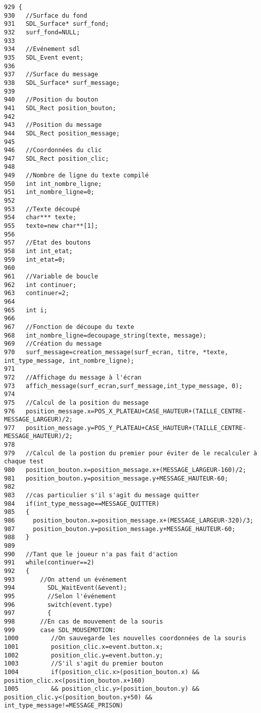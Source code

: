 \begin{Code}\begin{verbatim}929 {
930   //Surface du fond
931   SDL_Surface* surf_fond;
932   surf_fond=NULL;
933 
934   //Evénement sdl
935   SDL_Event event;
936   
937   //Surface du message
938   SDL_Surface* surf_message;
939   
940   //Position du bouton
941   SDL_Rect position_bouton;
942   
943   //Position du message
944   SDL_Rect position_message;
945   
946   //Coordonnées du clic
947   SDL_Rect position_clic;
948   
949   //Nombre de ligne du texte compilé
950   int int_nombre_ligne;
951   int_nombre_ligne=0;
952   
953   //Texte découpé
954   char*** texte;
955   texte=new char**[1];
956   
957   //Etat des boutons
958   int int_etat;
959   int_etat=0;
960   
961   //Variable de boucle
962   int continuer;
963   continuer=2;
964   
965   int i;
966   
967   //Fonction de découpe du texte 
968   int_nombre_ligne=decoupage_string(texte, message);
969   //Création du message
970   surf_message=creation_message(surf_ecran, titre, *texte, int_type_message, int_nombre_ligne);
971   
972   //Affichage du message à l'écran
973   affich_message(surf_ecran,surf_message,int_type_message, 0);
974   
975   //Calcul de la position du message
976   position_message.x=POS_X_PLATEAU+CASE_HAUTEUR+(TAILLE_CENTRE-MESSAGE_LARGEUR)/2;
977   position_message.y=POS_Y_PLATEAU+CASE_HAUTEUR+(TAILLE_CENTRE-MESSAGE_HAUTEUR)/2;
978   
979   //Calcul de la postion du premier pour éviter de le recalculer à chaque test
980   position_bouton.x=position_message.x+(MESSAGE_LARGEUR-160)/2;
981   position_bouton.y=position_message.y+MESSAGE_HAUTEUR-60;
982   
983   //cas particulier s'il s'agit du message quitter
984   if(int_type_message==MESSAGE_QUITTER)
985   {
986     position_bouton.x=position_message.x+(MESSAGE_LARGEUR-320)/3;
987     position_bouton.y=position_message.y+MESSAGE_HAUTEUR-60;
988   }
989   
990   //Tant que le joueur n'a pas fait d'action
991   while(continuer==2)
992   {
993       //On attend un événement
994         SDL_WaitEvent(&event);
995         //Selon l'événement
996         switch(event.type)
997         {
998       //En cas de mouvement de la souris
999       case SDL_MOUSEMOTION:
1000         //On sauvegarde les nouvelles coordonnées de la souris
1001         position_clic.x=event.button.x;
1002         position_clic.y=event.button.y;
1003         //S'il s'agit du premier bouton
1004         if(position_clic.x>(position_bouton.x) && position_clic.x<(position_bouton.x+160)
1005         && position_clic.y>(position_bouton.y) && position_clic.y<(position_bouton.y+50) && int_type_message!=MESSAGE_PRISON)

\end{verbatim}
\end{Code}

